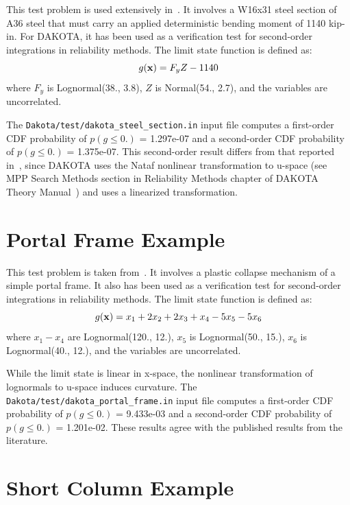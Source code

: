 This test problem is used extensively in~\cite{Hal00}.  It involves a
W16x31 steel section of A36 steel that must carry an applied
deterministic bending moment of 1140 kip-in.  For DAKOTA, it has been
used as a verification test for second-order integrations in
reliability methods.  The limit state function is defined as:
\begin{equation}
g({\bf x}) = F_y Z - 1140
\end{equation}
where $F_y$ is Lognormal(38., 3.8), $Z$ is Normal(54., 2.7), and the
variables are uncorrelated.

The \texttt{Dakota/test/dakota\_steel\_section.in} input file computes
a first-order CDF probability of $p(g \leq 0.)$ = 1.297e-07 and a
second-order CDF probability of $p(g \leq 0.)$ = 1.375e-07.  This
second-order result differs from that reported in~\cite{Hal00}, since
DAKOTA uses the Nataf nonlinear transformation to u-space (see MPP
Search Methods section in Reliability Methods chapter of DAKOTA Theory
Manual~\cite{TheoMan}) and \cite{Hal00} uses a linearized
transformation.

\section{Portal Frame Example}\label{additional:portal_frame}

This test problem is taken from~\cite{Tve90,Hon99}.  It involves a
plastic collapse mechanism of a simple portal frame.  It also has been
used as a verification test for second-order integrations in 
reliability methods.  The limit state function is defined as:
\begin{equation}
g({\bf x}) = x_1 + 2 x_2 + 2 x_3 + x_4 - 5 x_5 - 5 x_6
\end{equation}
where $x_1 - x_4$ are Lognormal(120., 12.), $x_5$ is Lognormal(50.,
15.), $x_6$ is Lognormal(40., 12.), and the variables are uncorrelated.

While the limit state is linear in x-space, the nonlinear
transformation of lognormals to u-space induces curvature.  The
\texttt{Dakota/test/dakota\_portal\_frame.in} input file computes a
first-order CDF probability of $p(g \leq 0.)$ = 9.433e-03 and a
second-order CDF probability of $p(g \leq 0.)$ = 1.201e-02.  These
results agree with the published results from the literature.


\section{Short Column Example}\label{additional:short_column}

